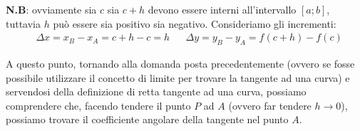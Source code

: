 \documentclass{report}
\begin{document}
\noindent \textbf{N.B}: ovviamente sia $c$ sia $c + h$ devono essere interni all'intervallo $[a; b]$, tuttavia $h$ può essere sia positivo sia negativo.
Consideriamo gli incrementi:
\begin{align*}
	&\Delta x = x_B - x_A = c + h - c = h & &\Delta y = y_B - y_A = f(c + h) - f(c)
\end{align*}
\par\noindent\smallskip A questo punto, tornando alla domanda posta precedentemente (ovvero se fosse possibile utilizzare il concetto di limite per trovare la tangente ad una curva) e servendosi della definizione di retta tangente ad una curva, possiamo comprendere che, facendo tendere il punto $P$ ad $A$ (ovvero far tendere $h \to 0$), possiamo trovare il coefficiente angolare della tangente nel punto $A$.
\end{document}

